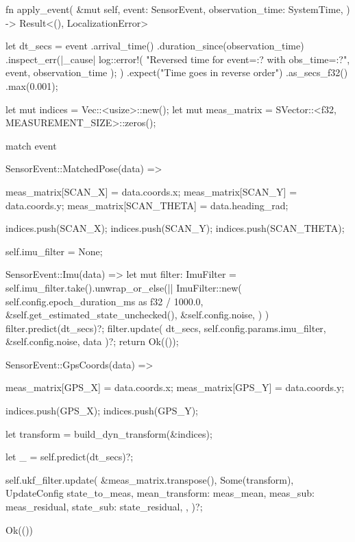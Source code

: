 \begin{lslisting}
fn apply_event(
    &mut self,
    event: SensorEvent,
    observation_time: SystemTime,
) -> Result<(), LocalizationError> {
    let dt_secs = event
        .arrival_time()
        .duration_since(observation_time)
        .inspect_err(|_cause| {
            log::error!(
                "Reversed time for event={:?} with obs_time={:?}",
                event,
                observation_time
            );
        })
        .expect("Time goes in reverse order")
        .as_secs_f32()
        .max(0.001);

    let mut indices = Vec::<usize>::new();
    let mut meas_matrix = SVector::<f32, MEASUREMENT_SIZE>::zeros();

    match event {
        SensorEvent::MatchedPose(data) => {
            meas_matrix[SCAN_X] = data.coords.x;
            meas_matrix[SCAN_Y] = data.coords.y;
            meas_matrix[SCAN_THETA] = data.heading_rad;

            indices.push(SCAN_X);
            indices.push(SCAN_Y);
            indices.push(SCAN_THETA);

            self.imu_filter = None;
        }

	SensorEvent::Imu(data) => {
            let mut filter: ImuFilter =
                self.imu_filter.take().unwrap_or_else(|| {
                    ImuFilter::new(
                        self.config.epoch_duration_ms as f32 / 1000.0,
                        &self.get_estimated_state_unchecked(),
                        &self.config.noise,
                    )
                })
            filter.predict(dt_secs)?;
            filter.update(
                    dt_secs,
                    self.config.params.imu_filter,
                    &self.config.noise,
		    data
            )?;
	    return Ok(());
        }

        SensorEvent::GpsCoords(data) => {
            meas_matrix[GPS_X] = data.coords.x;
            meas_matrix[GPS_Y] = data.coords.y;

            indices.push(GPS_X);
            indices.push(GPS_Y);
        }
    }

    let transform = build_dyn_transform(&indices);

    let _ = self.predict(dt_secs)?;

    self.ukf_filter.update(
        &meas_matrix.transpose(),
        Some(transform),
        UpdateConfig {
            state_to_meas,
            mean_transform: meas_mean,
            meas_sub: meas_residual,
            state_sub: state_residual,
        },
    )?;

    Ok(())
}
\end{lslisting}


